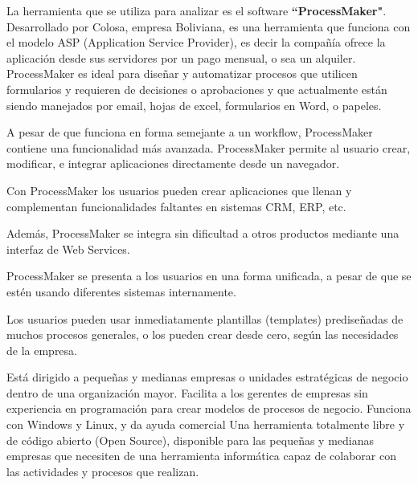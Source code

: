 La herramienta que se utiliza para analizar es el software \textbf{``ProcessMaker"}.
\\
Desarrollado por Colosa, empresa Boliviana, es una herramienta que funciona con el modelo ASP (Application Service Provider), es decir la compañía ofrece la aplicación desde sus servidores por un pago mensual, o sea un alquiler.
ProcessMaker es ideal para diseñar y automatizar procesos que utilicen formularios y requieren de decisiones o aprobaciones y que actualmente están siendo manejados por email, hojas de excel, formularios en Word, o papeles.

A pesar de que funciona en forma semejante a un workflow, ProcessMaker contiene una funcionalidad más avanzada. ProcessMaker permite al usuario crear, modificar, e integrar aplicaciones directamente desde un navegador.

Con ProcessMaker los usuarios pueden crear aplicaciones que llenan y complementan funcionalidades faltantes en sistemas CRM, ERP, etc.

Además, ProcessMaker se integra sin dificultad a otros productos mediante una interfaz de Web Services.

ProcessMaker se presenta a los usuarios en una forma unificada, a pesar de que se estén usando diferentes sistemas internamente.

Los usuarios pueden usar inmediatamente plantillas (templates) prediseñadas de muchos procesos generales, o los pueden crear desde cero, según las necesidades de la empresa.

Está dirigido a pequeñas y medianas empresas o unidades estratégicas de negocio dentro de una organización mayor. Facilita a los gerentes de empresas sin experiencia en programación para crear modelos de procesos de negocio. Funciona con Windows y Linux, y da ayuda comercial
Una herramienta totalmente libre y de código abierto (Open Source), disponible para las pequeñas y medianas empresas que necesiten de una herramienta informática capaz de colaborar con las actividades y procesos que realizan.

